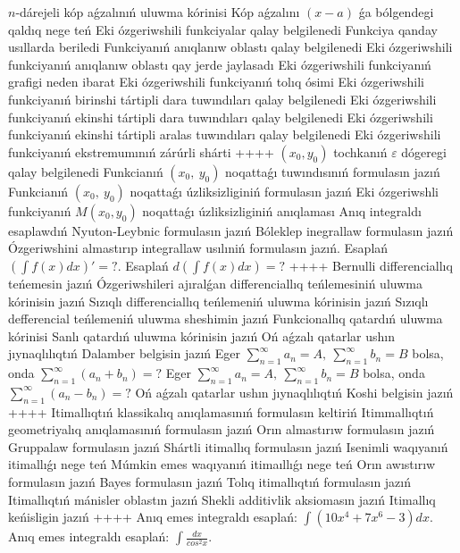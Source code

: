 \(n\)-dárejeli kóp aǵzalınıń uluwma kórinisi
Kóp aǵzalını \((x - a)\) ǵa bólgendegi qaldıq nege teń
Eki ózgeriwshili funkciyalar qalay belgilenedi
Funkciya qanday usıllarda beriledi
Funkciyanıń anıqlanıw oblastı qalay belgilenedi
Eki ózgeriwshili funkciyanıń anıqlanıw oblastı qay jerde jaylasadı
Eki ózgeriwshili funkciyanıń grafigi neden ibarat
Eki ózgeriwshili funkciyanıń tolıq ósimi
Eki ózgeriwshili funkciyanıń birinshi tártipli dara tuwındıları qalay belgilenedi
Eki ózgeriwshili funkciyanıń ekinshi tártipli dara tuwındıları qalay belgilenedi
Eki ózgeriwshili funkciyanıń ekinshi tártipli aralas tuwındıları qalay belgilenedi
Eki ózgeriwshili funkciyanıń ekstremumınıń zárúrli shárti
++++
\((x_0,y_0)\) tochkanıń \(\varepsilon\) dógeregi qalay belgilenedi
Funkcianıń \((x_{0},\ y_{0})\) noqattaǵı tuwındısınıń formulasın jazıń
Funkcianıń \((x_{0},\ y_{0})\) noqattaǵı úzliksizliginiń formulasın jazıń
Eki ózgeriwshli funkciyanıń \(M(x_{0}, y_{0})\) noqattaǵı úzliksizliginiń anıqlaması
Anıq integraldı esaplawdıń Nyuton-Leybnic formulasın jazıń
Bóleklep inegrallaw formulasın jazıń
Ózgeriwshini almastırıp integrallaw usılıniń formulasın jazıń.
Esaplań \(\left( \int{f(x)dx} \right)' = ?\).
Esaplań \(d\left( \int{f(x)dx} \right) = ?\)
++++
Bernulli differenciallıq teńemesin jazıń
Ózgeriwshileri ajıralǵan differenciallıq teńlemesiniń uluwma kórinisin jazıń
Sızıqlı differenciallıq teńlemeniń uluwma kórinisin jazıń
Sızıqlı defferencial teńlemeniń uluwma sheshimin jazıń
Funkcionallıq qatardıń uluwma kórinisi
Sanlı qatardıń uluwma kórinisin jazıń
Oń aǵzalı qatarlar ushın jıynaqlılıqtıń Dalamber belgisin jazıń
Eger \(\sum_{n = 1}^{\infty}a_{n} = A,\ \sum_{n = 1}^{\infty}b_{n} = B\) bolsa, onda \(\sum_{n = 1}^{\infty}\left( a_{n} + b_{n} \right) = ?\)
Eger \(\sum_{n = 1}^{\infty}a_{n} = A,\ \sum_{n = 1}^{\infty}b_{n} = B\) bolsa, onda \(\sum_{n = 1}^{\infty}\left( a_{n} - b_{n} \right) = ?\)
Oń aǵzalı qatarlar ushın jıynaqlılıqtıń Koshi belgisin jazıń
++++
Itimallıqtıń klassikalıq anıqlamasınıń formulasın keltiriń
Itimmallıqtıń geometriyalıq anıqlamasınıń formulasın jazıń
Orın almastırıw formulasın jazıń
Gruppalaw formulasın jazıń
Shártli itimallıq formulasın jazıń
Isenimli waqıyanıń itimallıǵı nege teń
Múmkin emes waqıyanıń itimaıllıǵı nege teń
Orın awıstırıw formulasın jazıń
Bayes formulasın jazıń
Tolıq itimallıqtıń formulasın jazıń
Itimallıqtıń mánisler oblastın jazıń
Shekli additivlik aksiomasın jazıń
Itimallıq keńisligin jazıń
++++
Anıq emes integraldı esaplań: \(\int{\left( 10x^{4} + 7x^{6} - 3 \right)dx}\).
Anıq emes integraldı esaplań: \(\int\frac{dx}{cos^2 x}\).
